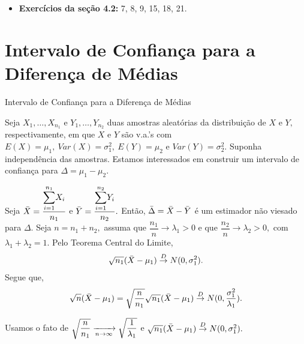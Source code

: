 \documentclass[12pt]{beamer}
\begin{document}
\begin{frame}{\Home}
\begin{block}{}
\justifying

\begin{itemize}
    \item \textbf{Exercícios da seção 4.2:} 7, 8, 9, 15, 18, 21.
\end{itemize}

\end{block}
\end{frame}

\section{Intervalo de Confiança para a Diferença de Médias}
\begin{frame}{Intervalo de Confiança para a Diferença de Médias}
\begin{block}{}
\justifying
Seja $X_{1},\ldots,X_{n_{1}}$ e $Y_{1},\ldots,Y_{n_{2}}$ duas amostras aleatórias da distribuição de $X$ e $Y,$ respectivamente, em que $X$ e $Y$ são v.a.'s com $E(X)=\mu_{1},~Var(X)=\sigma_{1}^{2},~E(Y)=\mu_{2}$ e $Var(Y)=\sigma^{2}_{2}.$ Suponha independência das amostras. Estamos interessados em construir um intervalo de confiança para $\Delta=\mu_{1}-\mu_{2}.$
\end{block}
\end{frame}

\begin{frame}{}
\begin{block}{}
\justifying
Seja $\Bar{X}=\dfrac{{\displaystyle \sum_{i=1}^{n_{1}}} X_{i}}{n_{1}}$ e $\Bar{Y}=\dfrac{{\displaystyle \sum_{i=1}^{n_{2}}} Y_{i}}{n_{2}}.$ Então, $\Bar{\Delta}=\Bar{X}-\Bar{Y}$ é um estimador não viesado para $\Delta.$ Seja $n=n_{1}+n_{2},$ assuma que $\dfrac{n_{1}}{n}\xrightarrow{} \lambda_{1}>0$ e que $\dfrac{n_{2}}{n}\xrightarrow{} \lambda_{2}>0,$ com $\lambda_{1}+\lambda_{2}=1.$ Pelo Teorema Central do Limite,
\begin{align*}
\sqrt{n_{1}}(\Bar{X}-\mu_{1})\overset{D}{\rightarrow} N(0,\sigma_{1}^{2}).
\end{align*}
Segue que,
\begin{align*}
\sqrt{n}(\Bar{X}-\mu_{1})=\sqrt{\dfrac{n}{n_{1}}}\sqrt{n_{1}}(\Bar{X}-\mu_{1})\overset{D}{\rightarrow} N(0,\dfrac{\sigma_{1}^{2}}{\lambda_{1}}).
\end{align*}
\end{block}
\pause
\begin{block}{}
\justifying
Usamos o fato de $\sqrt{\dfrac{n}{n_{1}}}\xrightarrow[n\rightarrow\infty]{}\sqrt{\dfrac{1}{\lambda_{1}}}$ e $\sqrt{n_{1}}(\Bar{X}-\mu_{1})\overset{D}{\rightarrow} N(0,\sigma_{1}^{2}).$
\end{block}
\end{frame}
\end{document}
